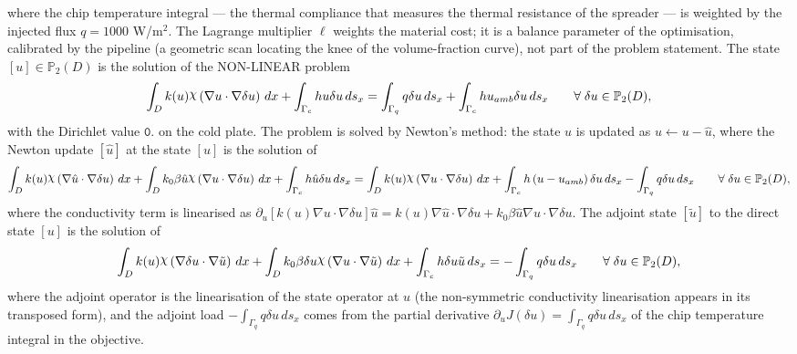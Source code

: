 \documentclass[preview]{standalone}
\let\oldcdot\cdot
\let\cdot\oldcdot
\begin{document}
where the chip temperature integral — the thermal compliance that measures the thermal resistance of the spreader — is weighted by the injected flux $q = 1000$ W/m$^{2}$.  The Lagrange multiplier $\ell$ weights the material cost; it is a balance parameter of the optimisation, calibrated by the pipeline (a geometric scan locating the knee of the volume-fraction curve), not part of the problem statement.
The state $\left[ u\right] \in \mathbb P_{2}(D)$ is the solution of the NON-LINEAR problem
\begin{dmath*}
\int_{D} k(u) \raisebox{\depth}{$\chi$} \left(  \nabla u  \cdot  \nabla \delta u  \right) \,dx + \int_{\Gamma_c} h u \delta u \,ds_x = \int_{\Gamma_q} q  \delta u \,ds_x + \int_{\Gamma_c} h u_{amb} \delta u \,ds_x \qquad \forall\; {\delta u\in \mathbb P_{2}(D)} ,
\end{dmath*}
with the Dirichlet value $\mathtt{\text{0.}}$ on the cold plate.
The problem is solved by Newton's method: the state $u$ is updated as $u \leftarrow u - \hat u$, where the Newton update $\left[ \hat u\right]$ at the state $\left[ u\right]$ is the solution of
\begin{dmath*}
\int_{D} k(u) \raisebox{\depth}{$\chi$} \left(  \nabla \hat u  \cdot  \nabla \delta u  \right) \,dx + \int_{D} k_0 \beta \hat u \raisebox{\depth}{$\chi$} \left(  \nabla u  \cdot  \nabla \delta u  \right) \,dx + \int_{\Gamma_c} h \hat u \delta u \,ds_x = \int_{D} k(u) \raisebox{\depth}{$\chi$} \left(  \nabla u  \cdot  \nabla \delta u  \right) \,dx + \int_{\Gamma_c} h \left( u - u_{amb}\right) \delta u \,ds_x - \int_{\Gamma_q} q  \delta u \,ds_x \qquad \forall\; {\delta u\in \mathbb P_{2}(D)} ,
\end{dmath*}
where the conductivity term is linearised as $\partial_{u} \left[ k(u) \nabla u \cdot \nabla \delta u\right] \hat u = k(u) \nabla \hat u \cdot \nabla \delta u + k_0 \beta \hat u \nabla u \cdot \nabla \delta u$.
The adjoint state $\left[ \tilde u\right]$ to the direct state $\left[ u\right]$ is the solution of
\begin{dmath*}
\int_{D} k(u) \raisebox{\depth}{$\chi$} \left(  \nabla \delta u  \cdot  \nabla \tilde u  \right) \,dx + \int_{D} k_0 \beta \delta u \raisebox{\depth}{$\chi$} \left(  \nabla u  \cdot  \nabla \tilde u  \right) \,dx + \int_{\Gamma_c} h \delta u \tilde u \,ds_x = - \int_{\Gamma_q} q \delta u \,ds_x \qquad \forall\; {\delta u\in \mathbb P_{2}(D)} ,
\end{dmath*}
where the adjoint operator is the linearisation of the state operator at $u$ (the non-symmetric conductivity linearisation appears in its transposed form), and the adjoint load $- \int_{\Gamma_q} q \delta u \,ds_x$ comes from the partial derivative $\partial_{u} J(\delta u) = \int_{\Gamma_q} q \delta u \,ds_x$ of the chip temperature integral in the objective.
\end{document}
